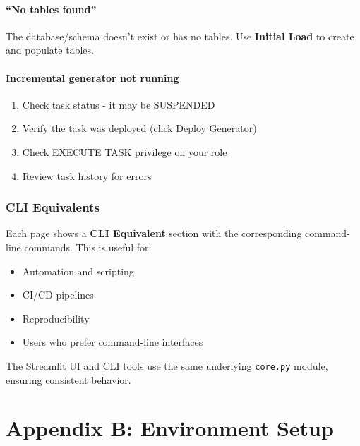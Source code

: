 \documentclass[
  letterpaper,
  DIV=11,
  numbers=noendperiod]{scrreprt}
\providecommand{\tightlist}{%
  \setlength{\itemsep}{0pt}\setlength{\parskip}{0pt}}\usepackage{longtable,booktabs,array}
\begin{document}
\hypertarget{no-tables-found}{%
\subsection{``No tables found''}\label{no-tables-found}}

The database/schema doesn't exist or has no tables. Use \textbf{Initial
Load} to create and populate tables.

\hypertarget{incremental-generator-not-running}{%
\subsection{Incremental generator not
running}\label{incremental-generator-not-running}}

\begin{enumerate}
\def\labelenumi{\arabic{enumi}.}
\tightlist
\item
  Check task status - it may be SUSPENDED
\item
  Verify the task was deployed (click Deploy Generator)
\item
  Check EXECUTE TASK privilege on your role
\item
  Review task history for errors
\end{enumerate}

\hypertarget{cli-equivalents}{%
\section{CLI Equivalents}\label{cli-equivalents}}

Each page shows a \textbf{CLI Equivalent} section with the corresponding
command-line commands. This is useful for:

\begin{itemize}
\tightlist
\item
  Automation and scripting
\item
  CI/CD pipelines
\item
  Reproducibility
\item
  Users who prefer command-line interfaces
\end{itemize}

The Streamlit UI and CLI tools use the same underlying \texttt{core.py}
module, ensuring consistent behavior.

\part{Appendix B: Environment Setup}
\end{document}
